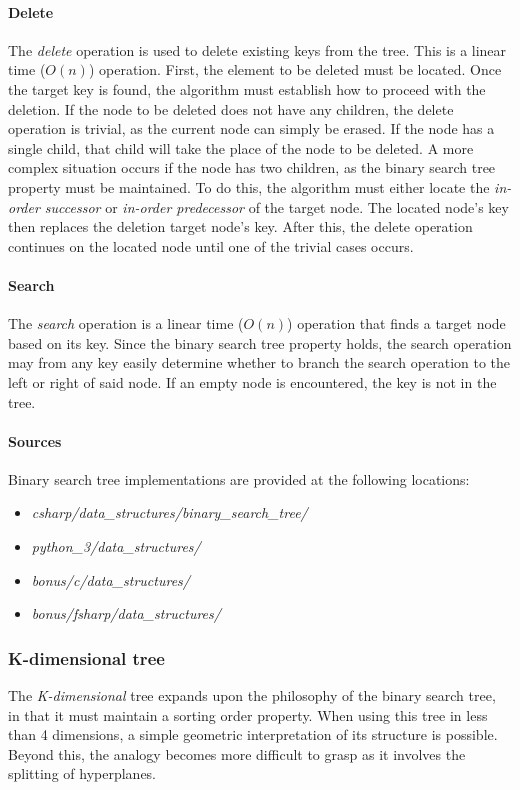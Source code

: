 \documentclass{article}
\begin{document}
{\paragraph{Delete}
The {\em delete} operation is used to delete existing keys from the tree. This is a linear time (\(O(n)\))
operation. First, the element to be deleted must be located. Once the target key is found, the algorithm must
establish how to proceed with the deletion. If the node to be deleted does not have any children, the delete
operation is trivial, as the current node can simply be erased. If the node has a single child, that child will
take the place of the node to be deleted. A more complex situation occurs if the node has two children, as the
binary search tree property must be maintained. To do this, the algorithm must either locate the
{\em in-order successor} or {\em in-order predecessor} of the target node. The located node's key then replaces
the deletion target node's key. After this, the delete operation continues on the located node until one of the
trivial cases occurs.

\paragraph{Search}
The {\em search} operation is a linear time (\(O(n)\)) operation that finds a target node based on its key.
Since the binary search tree property holds, the search operation may from any key easily determine whether to
branch the search operation to the left or right of said node. If an empty node is encountered, the key is
not in the tree.

\begin{samepage}
  \paragraph{Sources}
  Binary search tree implementations are provided at the following locations:
  \begin{itemize}
  \item{{\em csharp/data\_structures/binary\_search\_tree/}}
  \item{{\em python\_3/data\_structures/}}
  \item{{\em bonus/c/data\_structures/}}
  \item{{\em bonus/fsharp/data\_structures/}}
  \end{itemize}
\end{samepage}

\subsubsection{K-dimensional tree}
The {\em K-dimensional} tree expands upon the philosophy of the binary search tree, in that it
must maintain a sorting order property. When using this tree in less than 4 dimensions,
a simple geometric interpretation of its structure is possible. Beyond this, the analogy becomes
more difficult to grasp as it involves the splitting of hyperplanes.

}
\end{document}
